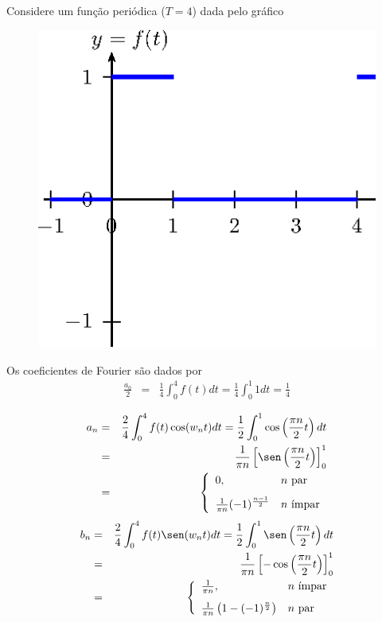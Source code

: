 \begin{ex}Considere um função periódica ($T=4$) dada pelo gráfico
\begin{figure}[!ht]
\begin{center}
\includegraphics{cap_diagramas_espectro/pics/figura_1}
\end{center}
\end{figure}
Os coeficientes de Fourier são dados por 
\begin{eqnarray*}
\frac{a_0}{2}&=&\frac{1}{4}\int_0^4f(t)dt=\frac{1}{4}\int_0^1 1 dt=\frac{1}{4}\\[10pt]
\end{eqnarray*}
\begin{eqnarray*}
a_n&=&\frac{2}{4}\int_0^4f(t)\cos(w_n t)dt=\frac{1}{2}\int_0^1\cos\left(\frac{\pi n}{2} t\right)dt\\&=&\frac{1}{\pi n}\left[\sen\left(\frac{\pi n}{2} t\right)\right]_0^1\\&=&\left\{\begin{array}{ll} 0,&n\ \hbox{par}\\[8pt]\frac{1}{\pi n}(-1)^{\frac{n-1}{2}}&n\ \hbox{ímpar}  \end{array}\right.
\end{eqnarray*}
\begin{eqnarray*}
b_n&=&\frac{2}{4}\int_0^4f(t)\sen(w_n t)dt=\frac{1}{2}\int_0^1\sen\left(\frac{\pi n}{2} t\right)dt\\&=&\frac{1}{\pi n}\left[-\cos\left(\frac{\pi n}{2} t\right)\right]_0^1\\&=&\left\{\begin{array}{ll} \frac{1}{\pi n},&n\ \hbox{ímpar}\\[8pt] \frac{1}{\pi n}\left(1-(-1)^{\frac{n}{2}}\right)&n\ \hbox{par}  \end{array}\right.\\

\end{eqnarray*}
\end{ex}
